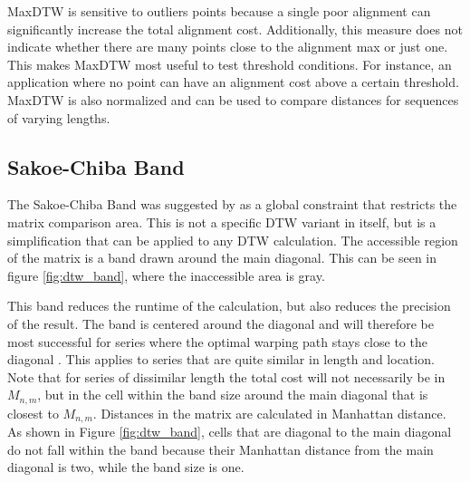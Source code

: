MaxDTW is sensitive to outliers points because a single poor alignment can significantly increase the total alignment cost. Additionally, this measure does not indicate whether there are many points close to the alignment max or just one. This makes MaxDTW most useful to test threshold conditions. For instance, an application where no point can have an alignment cost above a certain threshold. MaxDTW is also normalized and can be used to compare distances for sequences of varying lengths.

\subsection{Sakoe-Chiba Band}
\label{sec:sakoe}
The Sakoe-Chiba Band was suggested by \textcite{sakoe1978dynamic} as a global constraint that restricts the matrix comparison area. This is not a specific DTW variant in itself, but is a simplification that can be applied to any DTW calculation. The accessible region of the matrix is a band drawn around the main diagonal. This can be seen in figure \ref{fig:dtw_band}, where the inaccessible area is gray.

This band reduces the runtime of the calculation, but also reduces the precision of the result. The band is centered around the diagonal and will therefore be most successful for series where the optimal warping path stays close to the diagonal \cite{sakoe1978dynamic}. This applies to series that are quite similar in length and location. Note that for series of dissimilar length the total cost will not necessarily be in $M_{n,m}$, but in the cell within the band size around the main diagonal that is closest to $M_{n,m}$. Distances in the matrix are calculated in Manhattan distance. As shown in Figure \ref{fig:dtw_band}, cells that are diagonal to the main diagonal do not fall within the band because their Manhattan distance from the main diagonal is two, while the band size is one.

